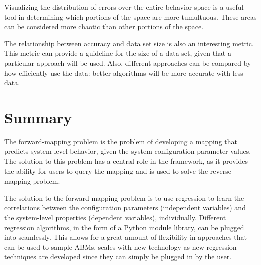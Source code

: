 Visualizing the distribution of errors over the entire behavior space is a useful tool in determining which portions of the space are more tumultuous.
These areas can be considered more chaotic than other portions of the space.

The relationship between accuracy and data set size is also an interesting metric.
This metric can provide a guideline for the size of a data set, given that a particular approach will be used.
Also, different approaches can be compared by how efficiently use the data: better algorithms will be more accurate with less data.






\section{Summary}

The forward-mapping problem is the problem of developing a mapping that predicts system-level behavior, given the system configuration parameter values.
The solution to this problem has a central role in the framework, as it provides the ability for users to query the mapping and is used to solve the reverse-mapping problem.

The solution to the forward-mapping problem is to use regression to learn the correlations between the configuration parameters (independent variables) and the system-level properties (dependent variables), individually.
Different regression algorithms, in the form of a Python module library, can be plugged into \fw seamlessly.
This allows for a great amount of flexibility in approaches that can be used to sample ABMs.
\fw scales with new technology as new regression techniques are developed since they can simply be plugged in by the user.


